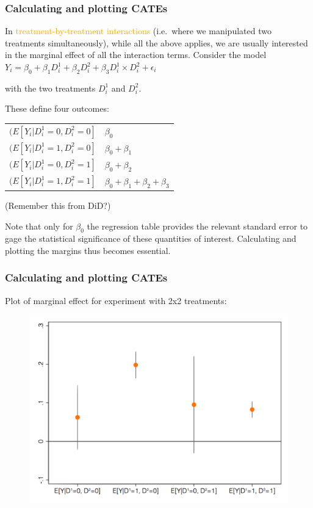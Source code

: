\documentclass[12pt,english,dvipsnames,aspectratio=169,handout]{beamer}\usepackage[]{graphicx}\usepackage[]{xcolor}
\begin{document}
\begin{frame}
  \frametitle{Calculating and plotting CATEs}
\footnotesize

In \textcolor{orange}{treatment-by-treatment interactions} (i.e.\ where we manipulated two treatments simultaneously), while all the above applies, we are usually interested in the marginal effect of all the interaction terms. Consider the model $Y_i = \beta_0 + \beta_1 D_i^1 + \beta_2 D_i^2+ \beta_3 D_i^1 \times D_i^2 + \epsilon_i$

with the two treatments $D_i^1$ and $D_i^2$. 

These define four outcomes:

\scriptsize
\centering
\begin{tabular}{ll}
$(E[Y_i|D_i^1=0, D_i^2=0]$ & $\beta_0$ \\ 
$(E[Y_i|D_i^1=1, D_i^2=0]$ & $\beta_0 + \beta_1$ \\ 
$(E[Y_i|D_i^1=0, D_i^2=1]$ & $\beta_0 + \beta_2$ \\
$(E[Y_i|D_i^1=1, D_i^2=1]$ & $\beta_0 + \beta_1 + \beta_2 + \beta_3$ \\ 
\end{tabular}

(Remember this from DiD?)

\flushleft\footnotesize
Note that only for $\beta_0$ the regression table provides the relevant standard error to gage the statistical significance of these quantities of interest. Calculating and plotting the margins thus becomes essential.

\end{frame}



\begin{frame}
  \frametitle{Calculating and plotting CATEs}
\footnotesize

Plot of marginal effect for experiment with 2x2 treatments:

	 \begin{figure} 
    \includegraphics[height=.7\textheight,keepaspectratio=true]{../04-figures/10/05-w10_treatreat}
    \end{figure}
    
\end{frame}
\end{document}
